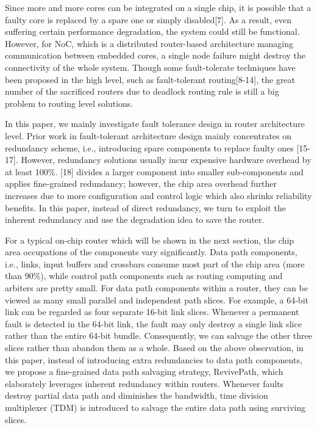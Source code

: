 Since more and more cores can be integrated on a single chip, it is possible that a faulty core is replaced by a spare one or simply disabled[7]. As a result, even suffering certain performance degradation, the system could still be functional. However, for NoC, which is a distributed router-based architecture managing communication between embedded cores, a single node failure might destroy the connectivity of the whole system. Though some fault-tolerate techniques have been proposed in the high level, such as fault-tolerant routing[8-14], the great number of the sacrificed routers due to deadlock routing rule is still a big problem to routing level solutions.

In this paper, we mainly investigate fault tolerance design in router architecture level. Prior work in fault-tolerant architecture design mainly concentrates on redundancy scheme, i.e., introducing spare components to replace faulty ones [15-17]. However, redundancy solutions usually incur expensive hardware overhead by at least 100\%. [18] divides a larger component into smaller sub-components and applies fine-grained redundancy; however, the chip area overhead further increases due to
more configuration and control logic which also shrinks reliability benefits. In this paper, instead of direct redundancy, we turn to exploit the inherent redundancy and use the degradation idea to save the router. 

For a typical on-chip router which will be shown in the next section, the chip area occupations of the components vary significantly. Data path components, i.e., links, input buffers and crossbars consume most part of the chip area (more than 90\%), while control path components such as routing computing and arbiters are pretty small. For data path components within a router, they can be viewed as many small parallel and independent path slices. For example, a 64-bit link can be regarded as four separate 16-bit link slices. Whenever a permanent fault is detected in the 64-bit link, the fault may only destroy a single link slice rather than the entire 64-bit bundle. Consequently, we can salvage the other three slices rather than abandon them as a whole. Based on the above observation, in this paper, instead of introducing extra redundancies to data path components, we propose a fine-grained data path salvaging strategy, RevivePath, which elaborately leverages inherent redundancy within routers. Whenever faults destroy partial data path and diminishes the bandwidth, time division multiplexer (TDM) is introduced to salvage the entire data path using surviving slices.

